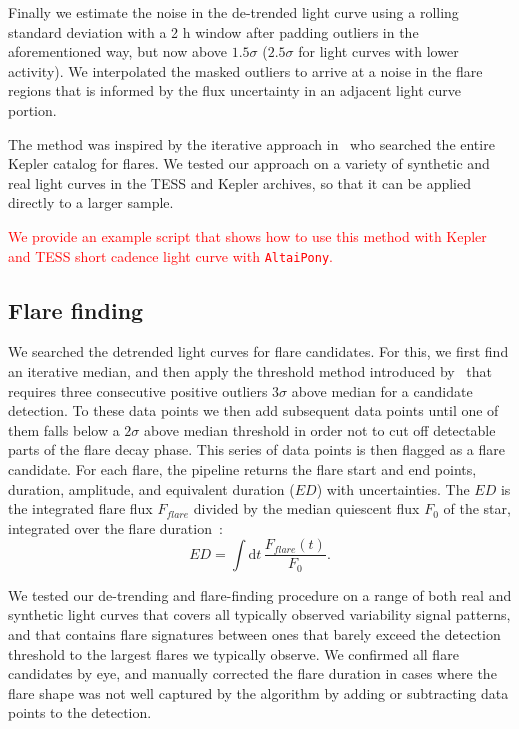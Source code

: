 \documentclass[fleqn,usenatbib,letters]{mnras}%
\begin{document}
Finally we estimate the noise in the de-trended light curve using a rolling standard deviation with a 2 h window after padding outliers in the aforementioned way, but now above $1.5 \sigma$ ($2.5 \sigma$ for light curves with lower activity). We interpolated the masked outliers to arrive at a noise in the flare regions that is informed by the flux uncertainty in an adjacent light curve portion.

The method was inspired by the iterative approach in~\citet{davenport2016} who searched the entire Kepler catalog for flares. We tested our approach on a variety of synthetic and real light curves in the TESS and Kepler archives, so that it can be applied directly to a larger sample.

\textcolor{red}{We provide an example script that shows how to use this method with Kepler and TESS short cadence light curve with \texttt{AltaiPony}.}

\subsection{Flare finding}
\label{sec:flarefind}
We searched the detrended light curves for flare candidates. For this, we first find an iterative median, and then apply the threshold method introduced by~\citep{chang2015} that requires three consecutive positive outliers $3 \sigma$ above median for a candidate detection. To these data points we then add subsequent data points until one of them falls below a $2 \sigma$ above median threshold in order not to cut off detectable parts of the flare decay phase. This series of data points is then flagged as a flare candidate. For each flare, the pipeline returns the flare start and end points, duration, amplitude, and equivalent duration ($ED$) with uncertainties. The $ED$ is the integrated flare flux $F_{flare}$ divided by the median quiescent flux $F_0$ of the star, integrated over the flare duration~\citep{gershberg1972}:
\begin{equation}
\label{eq:ED}
ED=\displaystyle \int \mathrm dt\, \frac{F_{flare}(t)}{F_0}.
\end{equation}

We tested our de-trending and flare-finding procedure on a range of both real and synthetic light curves that covers all typically observed variability signal patterns, and that contains flare signatures between ones that barely exceed the detection threshold to the largest flares we typically observe. We confirmed all flare candidates by eye, and manually corrected the flare duration in cases where the flare shape was not well captured by the algorithm by adding or subtracting data points to the detection. 
\end{document}

